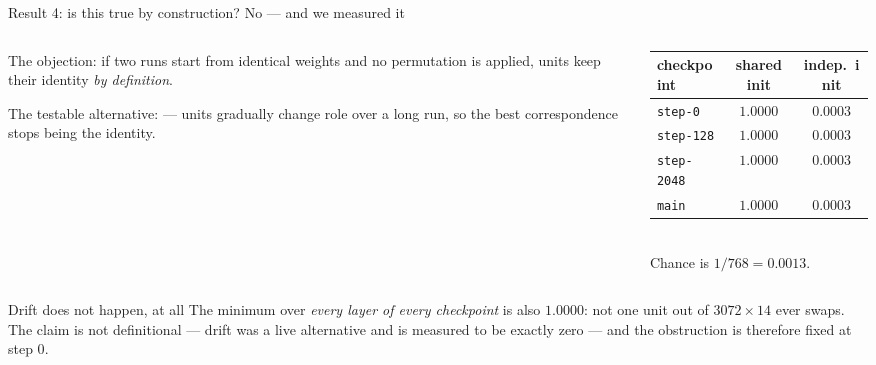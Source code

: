 \documentclass{beamer}
\begin{document}
\begin{frame}{Result 4: is this true by construction? No --- and we measured it}
  \begin{columns}[T]
    \begin{column}{0.46\textwidth}
      {\footnotesize The objection: if two runs start from identical weights and no permutation is
      applied, units keep their identity \emph{by definition}.
      \vspace{0.5em}

      The testable alternative:  --- units gradually change role
      over a long run, so the best correspondence stops being the identity.}
    \end{column}
    \begin{column}{0.52\textwidth}
      \centering\footnotesize
      \begin{tabular}{lcc}
        \toprule
        checkpoint & shared init & indep.\ init \\
        \midrule
        \texttt{step-0}    & $1.0000$ & $0.0003$ \\
        \texttt{step-128}  & $1.0000$ & $0.0003$ \\
        \texttt{step-2048} & $1.0000$ & $0.0003$ \\
        \texttt{main}      & $\mathbf{1.0000}$ & $\mathbf{0.0003}$ \\
        \bottomrule
      \end{tabular}
      \\[0.4em]
      {\footnotesize Chance is $1/768 = 0.0013$.}
    \end{column}
  \end{columns}
  \vfill
  \begin{block}{Drift does not happen, at all}
    The minimum over \emph{every layer of every checkpoint} is also $1.0000$: not one unit out of
    $3072 \times 14$ ever swaps. The claim is not definitional --- drift was a live alternative and
    is measured to be exactly zero --- and the obstruction is therefore \alert{fixed at step 0}.
  \end{block}
\end{frame}
\end{document}
